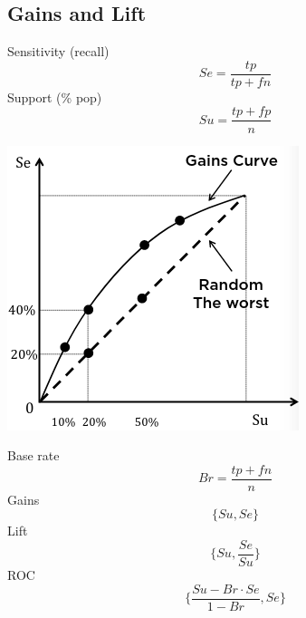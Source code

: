 \documentclass{article}[18pt]
\begin{document}
\subsection{Gains and Lift}
Sensitivity (recall)
$$Se=\dfrac{tp}{tp+fn}$$
Support (\% pop)
$$Su=\dfrac{tp+fp}{n}$$
\begin{center}
	\includegraphics[scale=0.7]{"Gains and Lift"}
\end{center}
Base rate
$$Br=\dfrac{tp+fn}{n}$$
Gains
$$\{Su,Se\}$$
Lift
$$\{Su,\dfrac{Se}{Su}\}$$
ROC
$$\{\dfrac{Su-Br\cdot Se}{1-Br},Se\}$$
\end{document}
